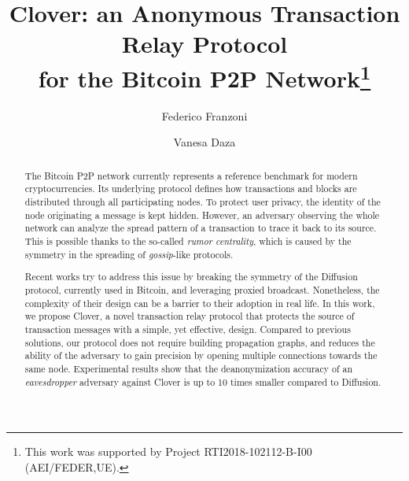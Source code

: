 \documentclass{article}
\begin{document}
	
	\title{Clover: an Anonymous Transaction Relay Protocol\\for the Bitcoin P2P Network\thanks{This work was supported by Project RTI2018-102112-B-I00 (AEI/FEDER,UE).} %
	}
	
	
	\author[]{Federico Franzoni} %
\author[]{Vanesa Daza} %
%
	\date{}
	
	
	\maketitle
	
	\begin{abstract}
		The Bitcoin P2P network currently represents a reference benchmark for modern cryptocurrencies.
		Its underlying protocol defines how transactions and blocks are distributed through all participating nodes.
		To protect user privacy, the identity of the node originating a message is kept hidden.
		However, an adversary observing the whole network can analyze the spread pattern of a transaction to trace it back to its source.
		This is possible thanks to the so-called \textit{rumor centrality}, which is caused by the symmetry in the spreading of \textit{gossip}-like protocols.
		
		Recent works try to address this issue by breaking the symmetry of the Diffusion protocol, currently used in Bitcoin, and leveraging proxied broadcast.
		Nonetheless, the complexity of their design can be a barrier to their adoption in real life.
		In this work, we propose Clover, a novel transaction relay protocol that protects the source of transaction messages with a simple, yet effective, design.
		Compared to previous solutions, our protocol does not require building propagation graphs, and reduces the ability of the adversary to gain precision by opening multiple connections towards the same node.
		Experimental results show that the deanonymization accuracy of an \textit{eavesdropper} adversary against Clover is up to 10 times smaller compared to Diffusion.
	\end{abstract}
	
\end{document}
